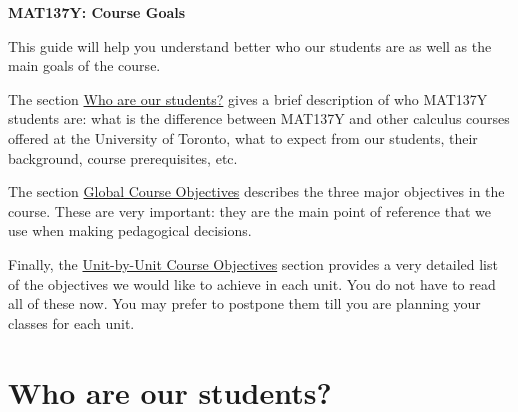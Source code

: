 \documentclass[11pt]{article}
\begin{document}
	\thispagestyle{plain}
	\begin{center}
		{\bf {\LARGE \textcolor{137cp3}{MAT137Y: Course Goals} }

		\medskip {\Large \textcolor{137cp1}{Alfonso Gracia-Saz} }}
	\end{center}


	This guide will help you understand better who our students are as well as the main goals of the course.

	The section \hyperref[who]{Who are our students?} gives a brief description of who MAT137Y students are: what is the difference between MAT137Y and other calculus courses offered at the University of Toronto, what to expect from our students, their background, course prerequisites, etc.

	The section \hyperref[GCO]{Global Course Objectives} describes the three major objectives in the course. These are very important: they are the main point of reference that we use when making pedagogical decisions.

	Finally, the \hyperref[Appendix]{Unit-by-Unit Course Objectives} section provides a very detailed list of the objectives we would like to achieve in each unit. You do not have to read all of these now. You may prefer to postpone them till you are planning your classes for each unit.



	\tableofcontents

	\newpage

	\section{Who are our students?}
\end{document}
